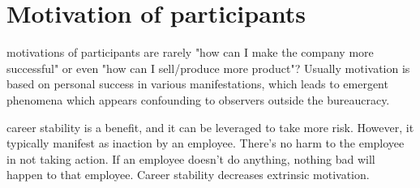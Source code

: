 \section{Motivation of participants}

motivations of participants are rarely "how can I make the company more successful" or even "how can I sell/produce more product"? Usually motivation is based on personal success in various manifestations, which leads to emergent phenomena which appears confounding to observers outside the bureaucracy. 



career stability is a benefit, and it can be leveraged to take more risk. However, it typically manifest as inaction by an employee. There's no harm to the employee in not taking action. If an employee doesn't do anything, nothing bad will happen to that employee. Career stability decreases extrinsic motivation.